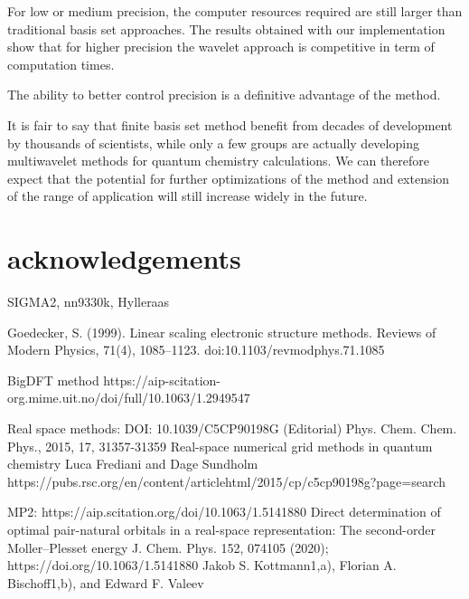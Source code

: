 \documentclass{article}
\begin{document}
For low or medium precision, the computer resources required are still larger than traditional basis set approaches. The results obtained with our implementation show that for higher precision the wavelet approach is competitive in term of computation times.

The ability to better control precision is a definitive advantage of the method. 



It is fair to say that finite basis set method benefit from decades of development by thousands of scientists, while only a few groups are actually developing multiwavelet methods for quantum chemistry calculations. We can therefore expect that the potential for further optimizations of the method and extension of the range of application will still increase widely in the future. %


\section{acknowledgements}
SIGMA2, nn9330k, Hylleraas






Goedecker, S. (1999). Linear scaling electronic structure methods. Reviews of Modern Physics, 71(4), 1085–1123. doi:10.1103/revmodphys.71.1085 

BigDFT method
https://aip-scitation-org.mime.uit.no/doi/full/10.1063/1.2949547

Real space methods:
 DOI: 10.1039/C5CP90198G (Editorial) Phys. Chem. Chem. Phys., 2015, 17, 31357-31359
Real-space numerical grid methods in quantum chemistry
Luca Frediani and Dage Sundholm
https://pubs.rsc.org/en/content/articlehtml/2015/cp/c5cp90198g?page=search


MP2:
https://aip.scitation.org/doi/10.1063/1.5141880
Direct determination of optimal pair-natural orbitals in a real-space representation: The second-order Moller–Plesset energy
 J. Chem. Phys. 152, 074105 (2020); https://doi.org/10.1063/1.5141880
Jakob S. Kottmann1,a), Florian A. Bischoff1,b), and Edward F. Valeev
\end{document}

